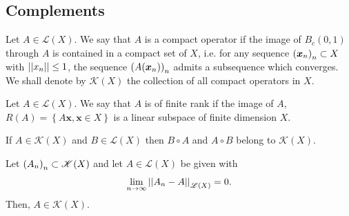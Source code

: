 \documentclass{article}
\begin{document}
\subsection{Complements}
\begin{definition}
	Let $A\in\mathscr{L}(X)$. We say that $A$ is a compact operator if the image of $B_{c}(0,1)$ through $A$ is contained in a compact set of $X$, i.e. for any sequence ${\left({\bm{x}}_{n}\right)}_{n}\subset X$ with $\left|\left|x_{n}\right|\right|\leq1$, the sequence ${\left(A(\bm{x}_{n})\right)}_{n}$ admits a subsequence which converges. We shall denote by $\mathscr{K}(X)$ the collection of all compact operators in $X$.
\end{definition}
\begin{definition}
	Let $A\in\mathscr{L}(X)$. We say that $A$ is of finite rank if the image of $A$, $R(A)=\left\{A\bm{x},\bm{x}\in X\right\}$ is a linear subspace of finite dimension $X$.
\end{definition}
\begin{lemma}
	If $A\in\mathscr{K}(X)$ and $B\in\mathscr{L}(X)$ then $B\circ A$ and $A\circ B$ belong to $\mathscr{K}(X)$.
\end{lemma}
\begin{proposition}
	Let ${\left({A}_{n}\right)}_{n}\subset\mathscr{K}(X)$ and let $A\in\mathscr{L}(X)$ be given with
	\begin{equation*}
		\lim_{n\to\infty}\left|\left|A_{n}-A\right|\right|_{\mathscr{L}(X)}=0.
	\end{equation*}
	Then, $A\in\mathscr{K}(X)$.
\end{proposition}
\end{document}
